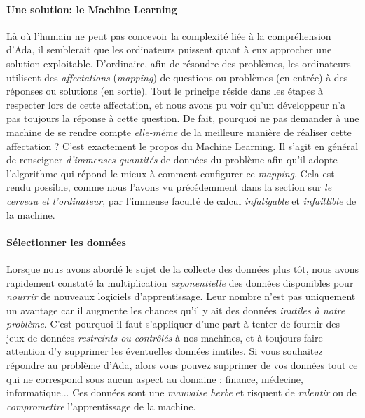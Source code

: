 \paragraph{Une solution: le Machine Learning} Là où l'humain ne peut pas concevoir la complexité liée à la compréhension d'Ada, il semblerait que les
ordinateurs puissent quant à eux approcher une solution exploitable. D'ordinaire, afin de résoudre des problèmes, les ordinateurs utilisent des \emph{affectations}
(\emph{mapping}) de questions ou problèmes (en entrée) à des réponses ou solutions (en sortie). Tout le principe réside dans les étapes à respecter lors de
cette affectation, et nous avons pu voir qu'un développeur n'a pas toujours la réponse à cette question. De fait, pourquoi ne pas demander à une 
machine de se rendre compte \emph{elle-même} de la meilleure manière de réaliser cette affectation \cite{MachineLearning0} ? C'est exactement le propos du Machine
Learning. Il s'agit en général de renseigner \emph{d'immenses quantités} de données du problème afin qu'il adopte l'algorithme qui répond le mieux à
comment configurer ce \emph{mapping}. Cela est rendu possible, comme nous l'avons vu précédemment dans la section sur \emph{le cerveau et l'ordinateur},
par l'immense faculté de calcul \emph{infatigable} et \emph{infaillible} de la machine.

\paragraph{Sélectionner les données}\label{select_data_ml} Lorsque nous avons abordé le sujet de la collecte des données plus tôt, nous avons rapidement constaté la 
multiplication \emph{exponentielle} des données disponibles pour \emph{nourrir} de nouveaux logiciels d'apprentissage. Leur nombre n'est pas
uniquement un avantage car il augmente les chances qu'il y ait des données \emph{inutiles à notre problème}. C'est pourquoi il faut s'appliquer
d'une part à tenter de fournir des jeux de données \emph{restreints ou contrôlés} à nos machines, et à toujours faire attention d'y supprimer les
éventuelles données inutiles. Si vous souhaitez répondre au problème d'Ada, alors vous pouvez supprimer de vos données tout ce qui ne correspond
sous aucun aspect au domaine : finance, médecine, informatique... Ces données sont une \emph{mauvaise herbe} et risquent de \emph{ralentir} ou de
\emph{compromettre} l'apprentissage de la machine. 


